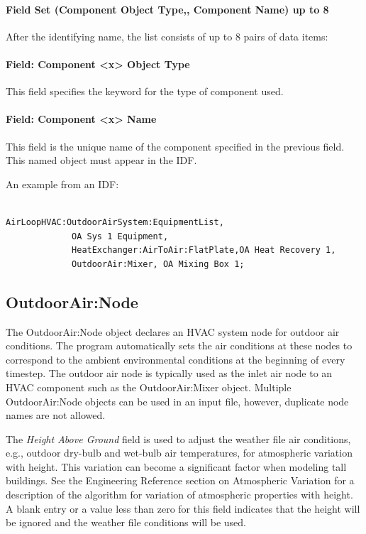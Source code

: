 \paragraph{Field Set (Component Object Type,, Component Name) up to 8}\label{field-set-component-object-type-component-name-up-to-8}

After the identifying name, the list consists of up to 8 pairs of data items:

\paragraph{Field: Component \textless{}x\textgreater{} Object Type}\label{field-component-x-object-type}

This field specifies the keyword for the type of component used.

\paragraph{Field: Component \textless{}x\textgreater{} Name}\label{field-component-x-name}

This field is the unique name of the component specified in the previous field. This named object must appear in the IDF.

An example from an IDF:

\begin{lstlisting}

AirLoopHVAC:OutdoorAirSystem:EquipmentList,
             OA Sys 1 Equipment,
             HeatExchanger:AirToAir:FlatPlate,OA Heat Recovery 1,
             OutdoorAir:Mixer, OA Mixing Box 1;
\end{lstlisting}

\subsection{OutdoorAir:Node}\label{outdoorairnode}

The OutdoorAir:Node object declares an HVAC system node for outdoor air conditions. The program automatically sets the air conditions at these nodes to correspond to the ambient environmental conditions at the beginning of every timestep. The outdoor air node is typically used as the inlet air node to an HVAC component such as the OutdoorAir:Mixer object. Multiple OutdoorAir:Node objects can be used in an input file, however, duplicate node names are not allowed.

The \emph{Height Above Ground} field is used to adjust the weather file air conditions, e.g., outdoor dry-bulb and wet-bulb air temperatures, for atmospheric variation with height. This variation can become a significant factor when modeling tall buildings. See the Engineering Reference section on Atmospheric Variation for a description of the algorithm for variation of atmospheric properties with height. A blank entry or a value less than zero for this field indicates that the height will be ignored and the weather file conditions will be used.

